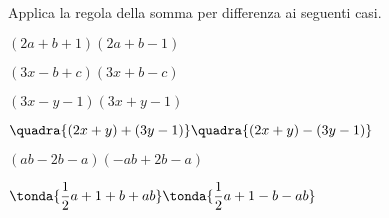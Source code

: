 \begin{esercizio}[*]
\label{ese:11.21}
Applica la regola della somma per differenza ai seguenti casi.

\begin{enumeratea}
\spazielenx
\item \((2a+b+1)(2a+b-1)\) 
\item \((3x-b+c)(3x+b-c)\) 
\item \((3x-y-1)(3x+y-1)\)
\item \(\quadra{(2x+y)+(3y-1)}\quadra{(2x+y)-(3y-1)}\) 
\item \((ab-2b-a)(-{ab}+2b-a)\)
\item \(\tonda{\dfrac{1}{2}a+1+b+ab}\tonda{\dfrac{1}{2}a+1-b-ab}\)
\end{enumeratea}
\end{esercizio}


